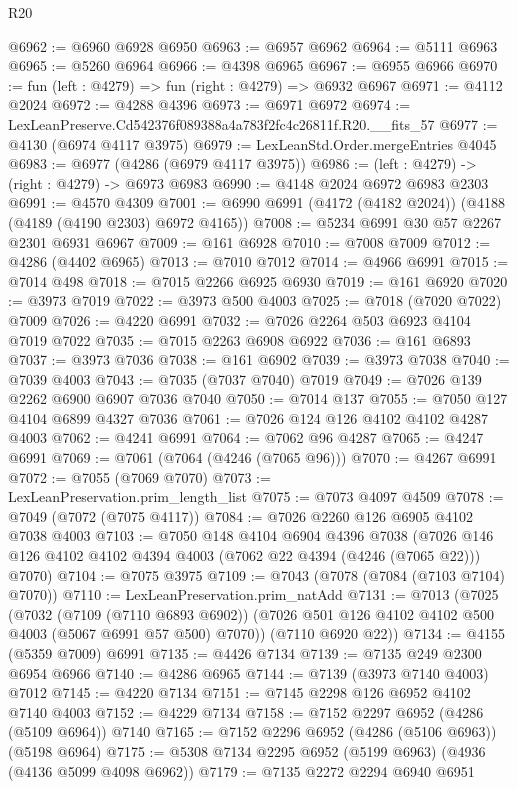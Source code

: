 \begin{lexlean}{R20}
\begin{coremodule}
@6962 := @6960 @6928 @6950
@6963 := @6957 @6962
@6964 := @5111 @6963
@6965 := @5260 @6964
@6966 := @4398 @6965
@6967 := @6955 @6966
@6970 := fun (left : @4279) => fun (right : @4279) => @6932 @6967
@6971 := @4112 @2024
@6972 := @4288 @4396
@6973 := @6971 @6972
@6974 := LexLeanPreserve.Cd542376f089388a4a783f2fc4c26811f.R20.__fits_57
@6977 := @4130 (@6974 @4117 @3975)
@6979 := LexLeanStd.Order.mergeEntries @4045
@6983 := @6977 (@4286 (@6979 @4117 @3975))
@6986 := (left : @4279) -> (right : @4279) -> @6973 @6983
@6990 := @4148 @2024 @6972 @6983 @2303
@6991 := @4570 @4309
@7001 := @6990 @6991 (@4172 (@4182 @2024)) (@4188 (@4189 (@4190 @2303) @6972 @4165))
@7008 := @5234 @6991 @30 @57 @2267 @2301 @6931 @6967
@7009 := @161 @6928
@7010 := @7008 @7009
@7012 := @4286 (@4402 @6965)
@7013 := @7010 @7012
@7014 := @4966 @6991
@7015 := @7014 @498
@7018 := @7015 @2266 @6925 @6930
@7019 := @161 @6920
@7020 := @3973 @7019
@7022 := @3973 @500 @4003
@7025 := @7018 (@7020 @7022) @7009
@7026 := @4220 @6991
@7032 := @7026 @2264 @503 @6923 @4104 @7019 @7022
@7035 := @7015 @2263 @6908 @6922
@7036 := @161 @6893
@7037 := @3973 @7036
@7038 := @161 @6902
@7039 := @3973 @7038
@7040 := @7039 @4003
@7043 := @7035 (@7037 @7040) @7019
@7049 := @7026 @139 @2262 @6900 @6907 @7036 @7040
@7050 := @7014 @137
@7055 := @7050 @127 @4104 @6899 @4327 @7036
@7061 := @7026 @124 @126 @4102 @4102 @4287 @4003
@7062 := @4241 @6991
@7064 := @7062 @96 @4287
@7065 := @4247 @6991
@7069 := @7061 (@7064 (@4246 (@7065 @96)))
@7070 := @4267 @6991
@7072 := @7055 (@7069 @7070)
@7073 := LexLeanPreservation.prim_length_list
@7075 := @7073 @4097 @4509
@7078 := @7049 (@7072 (@7075 @4117))
@7084 := @7026 @2260 @126 @6905 @4102 @7038 @4003
@7103 := @7050
    @148
    @4104
    @6904
    @4396
    @7038
    (@7026 @146 @126 @4102 @4102 @4394 @4003 (@7062 @22 @4394 (@4246 (@7065 @22))) @7070)
@7104 := @7075 @3975
@7109 := @7043 (@7078 (@7084 (@7103 @7104) @7070))
@7110 := LexLeanPreservation.prim_natAdd
@7131 := @7013
    (@7025
      (@7032
        (@7109 (@7110 @6893 @6902))
        (@7026 @501 @126 @4102 @4102 @500 @4003 (@5067 @6991 @57 @500) @7070))
      (@7110 @6920 @22))
@7134 := @4155 (@5359 @7009) @6991
@7135 := @4426 @7134
@7139 := @7135 @249 @2300 @6954 @6966
@7140 := @4286 @6965
@7144 := @7139 (@3973 @7140 @4003) @7012
@7145 := @4220 @7134
@7151 := @7145 @2298 @126 @6952 @4102 @7140 @4003
@7152 := @4229 @7134
@7158 := @7152 @2297 @6952 (@4286 (@5109 @6964)) @7140
@7165 := @7152 @2296 @6952 (@4286 (@5106 @6963)) (@5198 @6964)
@7175 := @5308 @7134 @2295 @6952 (@5199 @6963) (@4936 (@4136 @5099 @4098 @6962))
@7179 := @7135 @2272 @2294 @6940 @6951

\end{coremodule}
\end{lexlean}
